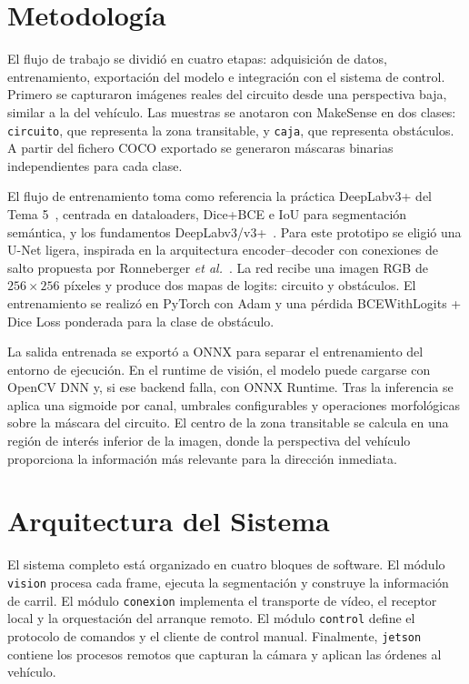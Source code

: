 \documentclass[conference,a4paper]{IEEEtran}
\begin{document}
\section{Metodolog\'ia}
El flujo de trabajo se dividi\'o en cuatro etapas: adquisici\'on de datos, entrenamiento, exportaci\'on del modelo e integraci\'on con el sistema de control. Primero se capturaron im\'agenes reales del circuito desde una perspectiva baja, similar a la del veh\'iculo. Las muestras se anotaron con MakeSense en dos clases: \texttt{circuito}, que representa la zona transitable, y \texttt{caja}, que representa obst\'aculos. A partir del fichero COCO exportado se generaron m\'ascaras binarias independientes para cada clase.

El flujo de entrenamiento toma como referencia la pr\'actica DeepLabv3+ del Tema 5~\cite{practica5}, centrada en dataloaders, Dice+BCE e IoU para segmentaci\'on sem\'antica, y los fundamentos DeepLabv3/v3+~\cite{deeplabv3,deeplabv3plus}. Para este prototipo se eligi\'o una U-Net ligera, inspirada en la arquitectura encoder--decoder con conexiones de salto propuesta por Ronneberger \textit{et al.}~\cite{ronneberger2015unet}. La red recibe una imagen RGB de $256 \times 256$ p\'ixeles y produce dos mapas de logits: circuito y obst\'aculos. El entrenamiento se realiz\'o en PyTorch con Adam y una p\'erdida BCEWithLogits + Dice Loss ponderada para la clase de obst\'aculo.

La salida entrenada se export\'o a ONNX para separar el entrenamiento del entorno de ejecuci\'on. En el runtime de visi\'on, el modelo puede cargarse con OpenCV DNN y, si ese backend falla, con ONNX Runtime. Tras la inferencia se aplica una sigmoide por canal, umbrales configurables y operaciones morfol\'ogicas sobre la m\'ascara del circuito. El centro de la zona transitable se calcula en una regi\'on de inter\'es inferior de la imagen, donde la perspectiva del veh\'iculo proporciona la informaci\'on m\'as relevante para la direcci\'on inmediata.

\section{Arquitectura del Sistema}
El sistema completo est\'a organizado en cuatro bloques de software. El m\'odulo \texttt{vision} procesa cada frame, ejecuta la segmentaci\'on y construye la informaci\'on de carril. El m\'odulo \texttt{conexion} implementa el transporte de v\'ideo, el receptor local y la orquestaci\'on del arranque remoto. El m\'odulo \texttt{control} define el protocolo de comandos y el cliente de control manual. Finalmente, \texttt{jetson} contiene los procesos remotos que capturan la c\'amara y aplican las \'ordenes al veh\'iculo.
\end{document}
